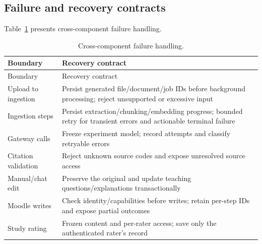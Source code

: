 \subsection{Failure and recovery contracts}
\par
Table~\ref{tab:12-design-details-2} presents cross-component failure handling.
\begin{longtable}{|p{3.7cm}|p{10.1cm}|}\caption{Cross-component failure handling.}\label{tab:12-design-details-2}\\\hline
Boundary & Recovery contract\\\hline\endfirsthead
\hline Boundary & Recovery contract\\\hline\endhead
Upload to ingestion & Persist generated file/document/job IDs before background processing; reject unsupported or excessive input\\\hline
Ingestion steps & Persist extraction/chunking/embedding progress; bounded retry for transient errors and actionable terminal failure\\\hline
Gateway calls & Freeze experiment model; record attempts and classify retryable errors\\\hline
Citation validation & Reject unknown source codes and expose unresolved source access\\\hline
Manual/chat edit & Preserve the original and update teaching questions/explanations transactionally\\\hline
Moodle writes & Check identity/capabilities before writes; retain per-step IDs and expose partial outcomes\\\hline
Study rating & Frozen content and per-rater access; save only the authenticated rater's record\\\hline
\end{longtable}

